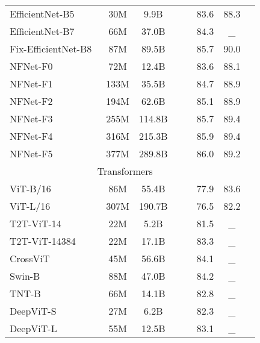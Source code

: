 \documentclass[10pt,twocolumn,letterpaper]{article}
\def \pzo {\phantom{0}}
\def \dzo {\phantom{00}}
\begin{document}
\begin{table*}
{\begin{tabular}{@{\ }lccccccc}
    EfficientNet-B5~\cite{tan2019efficientnet}    & \pzo30M & \dzo9.9B  &  &   & 83.6 & 88.3  \\
    EfficientNet-B7~\cite{tan2019efficientnet}    & \pzo66M & \pzo37.0B &  &   & 84.3 & \_      \\
    Fix-EfficientNet-B8~\cite{tan2019efficientnet, touvron2019fixing} & \pzo87M & \pzo89.5B &  &   & 85.7 & 90.0  \\
    \midrule
    NFNet-F0~\cite{brock2021high}           & \pzo72M & \pzo12.4B &  &  & 83.6 & 88.1  \\
    NFNet-F1~\cite{brock2021high}           & 133M    & \pzo35.5B &  &   & 84.7 & 88.9  \\
    NFNet-F2~\cite{brock2021high}           & 194M    & \pzo62.6B &  &   & 85.1 & 88.9  \\
    NFNet-F3~\cite{brock2021high}           & 255M    & 114.8B    &  &   & 85.7 & 89.4  \\
    NFNet-F4~\cite{brock2021high}           & 316M    & 215.3B    &  &    & 85.9 & 89.4  \\
    NFNet-F5~\cite{brock2021high}           & 377M    & 289.8B    &  &    & 86.0 & 89.2  \\
    \toprule
    \multicolumn{7}{c}{Transformers}\\
    \midrule
    ViT-B/16~\cite{dosovitskiy2020image}           & \pzo86M & \pzo55.4B &  &  & 77.9 & 83.6 \\
    ViT-L/16~\cite{dosovitskiy2020image}           & 307M    & 190.7B    &  &   & 76.5 & 82.2 \\
    \midrule
    T2T-ViT-14~\cite{yuan2021tokens}       & \pzo22M & \dzo5.2B  &  &         & 81.5 & \_  \\
    T2T-ViT-14384~\cite{yuan2021tokens} & \pzo22M & \pzo 17.1B  &  &         & 83.3 & \_ \\
    \midrule
    CrossViT~\cite{chen2021crossvit}           & \pzo45M & \pzo56.6B &  &         & 84.1 & \_ \\
    Swin-B~\cite{liu2021swin}             & \pzo88M & \pzo47.0B   &  &         & 84.2 & \_ \\
    TNT-B~\cite{han2021transformer}              & \pzo66M & \pzo14.1B &  &        & 82.8 & \_   \\
    \midrule
    DeepViT-S~\cite{zhou2021deepvit}          & \pzo27M & \dzo6.2B &  &        & 82.3 & \_   \\
    DeepViT-L~\cite{zhou2021deepvit}          & \pzo55M & \pzo12.5B &  &        & 83.1 & \_   \\         

\end{tabular}}
\end{table*}
\end{document}
